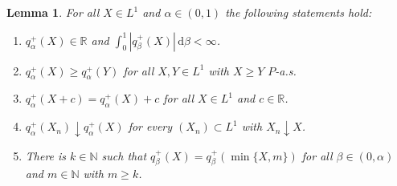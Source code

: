 \documentclass[12pt]{article}
\theoremstyle{plain}
\newtheorem{lemma}[theorem]{Lemma}
\theoremstyle{definition}
\theoremstyle{remark}
\numberwithin{equation}{section}
\newcommand{\probp}{P}
\newcommand{\R}{\mathbb{R}}
\newcommand{\N}{\mathbb{N}}
\newcommand{\dd}{\,\mathrm{d}}
\begin{document}
\begin{lemma}
\label{lem: quantiles}
For all $X\in L^1$ and $\alpha\in(0,1)$ the following statements hold:
\begin{enumerate}
    \item $q^+_\alpha(X)\in\R$ and $\int_0^1 |q^+_\beta(X)| \dd \beta < \infty$.
    \item $q^+_\alpha(X)\ge q^+_\alpha(Y)$ for all $X,Y\in L^1$ with $X\ge Y$ $\probp$-a.s.
    \item $q^+_\alpha(X+c)=q^+_\alpha(X)+c$ for all $X\in L^1$ and $c\in\R$.
    \item $q^+_\alpha(X_n)\downarrow q^+_\alpha(X)$ for every $(X_n)\subset L^1$ with $X_n\downarrow X$.
    \item There is $k\in\N$ such that $q^+_\beta(X)=q^+_\beta(\min\{X,m\})$ for all $\beta\in(0,\alpha)$ and $m\in\N$ with $m\ge k$.
\end{enumerate}
\end{lemma}
\end{document}
